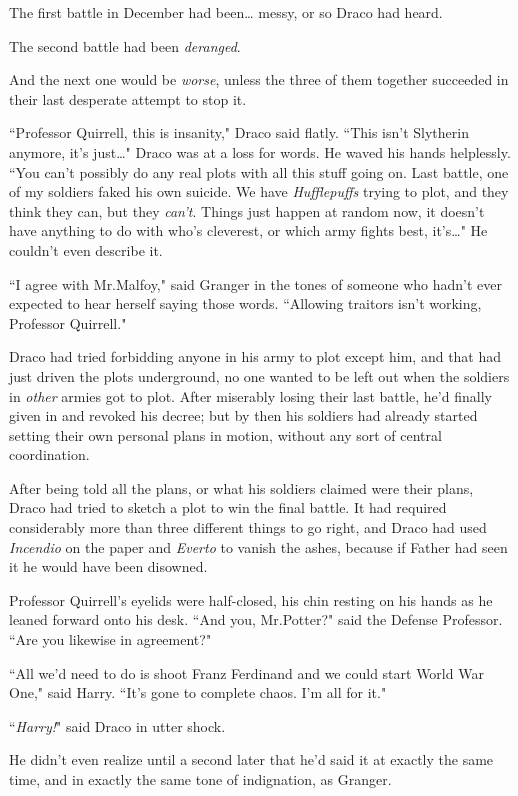 The first battle in December had been{\ldots} messy, or so Draco had heard.

The second battle had been \emph{deranged}.

And the next one would be \emph{worse}, unless the three of them together succeeded in their last desperate attempt to stop it.

``Professor Quirrell, this is insanity," Draco said flatly. ``This isn't Slytherin anymore, it's just{\ldots}" Draco was at a loss for words. He waved his hands helplessly. ``You can't possibly do any real plots with all this stuff going on. Last battle, one of my soldiers faked his own suicide. We have \emph{Hufflepuffs} trying to plot, and they think they can, but they \emph{can't}. Things just happen at random now, it doesn't have anything to do with who's cleverest, or which army fights best, it's{\ldots}" He couldn't even describe it.

``I agree with Mr.\?Malfoy," said Granger in the tones of someone who hadn't ever expected to hear herself saying those words. ``Allowing traitors isn't working, Professor Quirrell."

Draco had tried forbidding anyone in his army to plot except him, and that had just driven the plots underground, no one wanted to be left out when the soldiers in \emph{other} armies got to plot. After miserably losing their last battle, he'd finally given in and revoked his decree; but by then his soldiers had already started setting their own personal plans in motion, without any sort of central coordination.

After being told all the plans, or what his soldiers claimed were their plans, Draco had tried to sketch a plot to win the final battle. It had required considerably more than three different things to go right, and Draco had used \emph{Incendio} on the paper and \emph{Everto} to vanish the ashes, because if Father had seen it he would have been disowned.

Professor Quirrell's eyelids were half-closed, his chin resting on his hands as he leaned forward onto his desk. ``And you, Mr.\?Potter?" said the Defense Professor. ``Are you likewise in agreement?"

``All we'd need to do is shoot Franz Ferdinand and we could start World War One," said Harry. ``It's gone to complete chaos. I'm all for it."

``\emph{Harry!}" said Draco in utter shock.

He didn't even realize until a second later that he'd said it at exactly the same time, and in exactly the same tone of indignation, as Granger.

